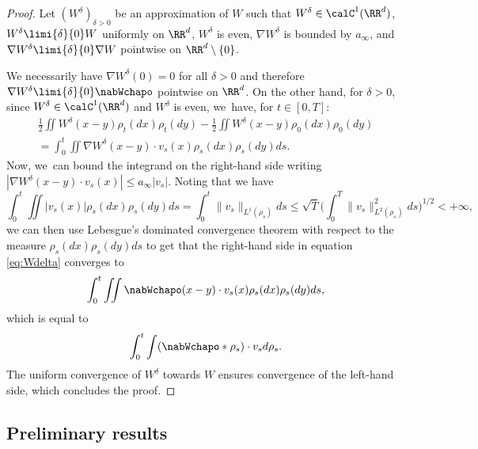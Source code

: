 \begin{proof}
Let $(W^\delta)_{\delta > 0}$ be an approximation of $W$ such that $W^\delta \in \calC^1(\RR^d)$, $W^\delta \limi{\delta}{0} W$ uniformly on $\RR^d$, $W^\delta$ is even, $\nabla W^\delta$ is bounded by $a_\infty$, and $\nabla W^\delta \limi{\delta}{0} \nabla W$ pointwise on $\RR^d \setminus \{0\}$.

We necessarily have $\nabla W^\delta(0) = 0$ for all $\delta>0$ and therefore $\nabla W^\delta \limi{\delta}{0} \nabWchapo$ pointwise on $\RR^d$. On the other hand, for $\delta > 0$, since $W^\delta \in \calC^1(\RR^d)$ and $W^\delta$ is even, we~have, for $t \in [0,T]$:
\begin{multline}\label{eq:Wdelta}
\frac 12 \iint W^\delta(x-y) \rho_t(dx) \rho_t(dy) - \frac 12 \iint W^\delta(x-y) \rho_0(dx) \rho_0(dy) \\
= \int_0^t \iint \nabla W^\delta(x-y) \cdot v_s(x) \rho_s(dx) \rho_s(dy) ds.
\end{multline}
Now, we~can bound the integrand on the right-hand side writing $|\nabla W^\delta(x-y) \cdot v_s(x)| \leq a_\infty |v_s|$. Noting that we have
\[
\int_0^t \iint |v_s(x)| \rho_s(dx)\rho_s(dy)ds = \int_0^t \|v_s\|_{L^1(\rho_s)} ds \leq \sqrt{T} \Big(\int_0^T \|v_s\|_{L^2(\rho_s)}^2 ds\Big)^{1/2} < +\infty,
\]
we can then use Lebesgue's dominated convergence theorem with respect to the measure $\rho_s(dx)\rho_s(dy)ds$ to get that the right-hand side in equation \eqref{eq:Wdelta} converges to
\[
\int_0^t \iint \nabWchapo(x-y) \cdot v_s(x) \rho_s(dx) \rho_s(dy) ds,
\]
which is equal to
\[
\int_0^t \int (\nabWchapo * \rho_s) \cdot v_s d\rho_s.
\]
The uniform convergence of $W^\delta$ towards $W$ ensures convergence of the left-hand side, which concludes the proof.
\end{proof}

\subsection{Preliminary results}

